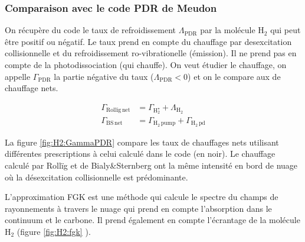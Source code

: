\subsubsection{Comparaison avec le code PDR de Meudon}

On récupère du code le taux de refroidissement $\Lambda_{\mathrm{PDR}}$ par la molécule $\mathrm{H}_2$ qui peut être positif ou négatif. Le taux prend en compte du chauffage par desexcitation collisionnelle et du refroidissement ro-vibrationelle (émission). Il ne prend pas en compte de la photodissociation (qui chauffe). On veut étudier le chauffage, on appelle $\Gamma_{\mathrm{PDR}}$ la partie négative du taux ($\Lambda_{\mathrm{PDR}} < 0$) et on le compare aux de chauffage nets.

\begin{equation}
    \begin{split}
        \Gamma_{\mathrm{Rollig} \, \mathrm{net}} &= \Gamma_{\mathrm{H}_2^\star} + \Lambda_{\mathrm{H}_2} \\ 
        \Gamma_{\mathrm{BS} \, \mathrm{net}} &=\Gamma_{\mathrm{H}_2 \, \mathrm{pump}} +  \Gamma_{\mathrm{H}_2 \, \mathrm{pd}} 
    \end{split}
\end{equation}

La figure \ref{fig:H2:GammaPDR} compare les taux de chauffages nets utilisant différentes prescriptions à celui calculé dans le code (en noir). Le chauffage calculé par Rollïg et de Bialy\&Sternberg ont la même intensité en bord de nuage où la désexcitation collisionnelle est prédominante. 

L'approximation FGK est une méthode qui calcule le spectre du champs de rayonnements à travers le nuage qui prend en compte l'absorption dans le continuum et le carbone. Il prend également en compte l'écrantage de la molécule $\mathrm{H}_2$ (figure \ref{fig:H2:fgk} \cite{FGK}). 



